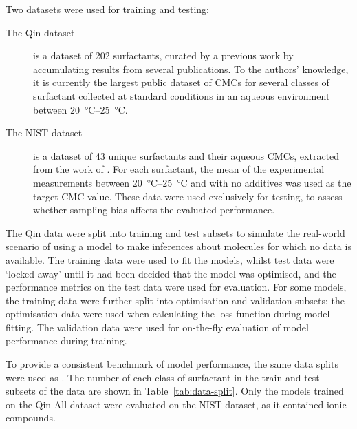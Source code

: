 \newcommand{\lrv}{\vec{v}^{\,(p)}}

Two datasets were used for training and testing:

\begin{description}
    \item[The Qin dataset] is a dataset of 202 surfactants, curated by a
          previous work \cite{qinPredictingCriticalMicelle2021} by accumulating
          results from several publications. To the authors' knowledge, it is
          currently the largest public dataset of CMCs for several classes of
          surfactant collected at standard conditions in an aqueous environment
          between \SIrange{20}{25}{\celsius}.
    \item[The NIST dataset] is a dataset of 43 unique surfactants and their
          aqueous CMCs, extracted from the work of
          \citet{mukerjeeCriticalMicelleConcentrations1971}. For each
          surfactant, the mean of the experimental measurements between
          \SIrange{20}{25}{\degreeCelsius} and with no additives was used as the
          target CMC value. These data were used exclusively for testing, to
          assess whether sampling bias affects the evaluated performance.
\end{description}

The Qin data \cite{qinPredictingCriticalMicelle2021} were split into training and test subsets to simulate the real-world scenario of using a model to make inferences about molecules for which no data is available. The training data were used to fit the models,
whilst test data were `locked away' until it had been decided that the model was optimised, and the performance metrics on the test data were used for evaluation. For some models, the training data were further split into optimisation and validation subsets; the optimisation data were used when calculating the loss function during model fitting. The validation data were used for on-the-fly evaluation of model performance during training.

To provide a consistent benchmark of model performance, the same data splits were used as \citet{qinPredictingCriticalMicelle2021}. The number of each class of surfactant in the train and test subsets of the data are shown in Table~\ref{tab:data-split}. Only the models trained on the Qin-All dataset were evaluated on the NIST dataset, as it contained ionic compounds.

